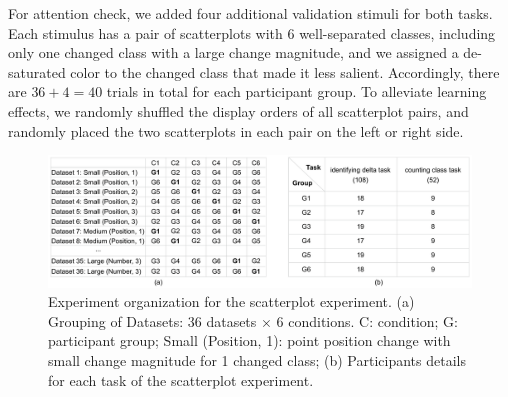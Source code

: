 {For attention check, we added four additional validation stimuli for both tasks. Each stimulus has a pair of scatterplots with 6 well-separated classes, including only one changed class with a large change magnitude, and we assigned a de-saturated color to the changed class that made it less salient. Accordingly, there are $36+4 = 40$ trials in total for each participant group. To alleviate learning effects, we randomly shuffled the display orders of all scatterplot pairs, and randomly placed the two scatterplots in each pair on the left or right side.




\begin{figure}[h]
\centering
\includegraphics[width=1\linewidth]{figures/experiment-organization.pdf}
\caption{Experiment organization for the scatterplot experiment. (a) Grouping of Datasets: $36$ datasets $\times$ $6$ conditions. C: condition; G: participant group; Small (Position, 1): point position change with small change magnitude for 1 changed class; (b) Participants details for each task of the scatterplot experiment.}
\vspace*{-3mm}
\label{fig:experimentOrgan}
\end{figure}

}
